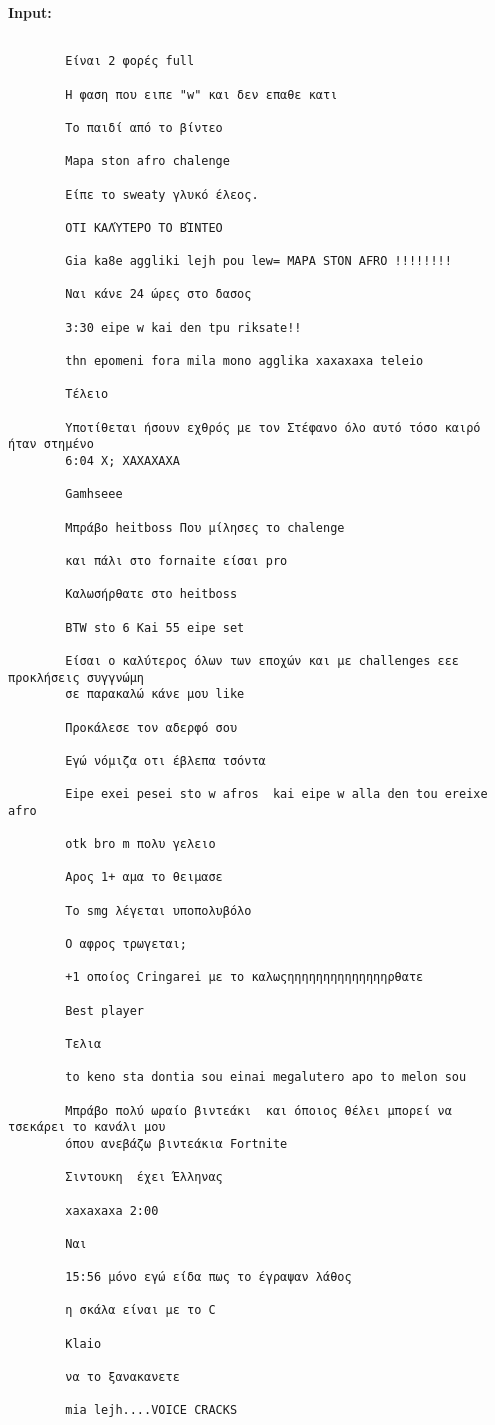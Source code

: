 \documentclass[11pt, a4paper]{article}
\begin{document}
	\textbf{Input:}
	\begin{verbatim}
		
		Είναι 2 φορές full
		
		Η φαση που ειπε "w" και δεν επαθε κατι
		
		Το παιδί από το βίντεο
		
		Mapa ston afro chalenge
		
		Είπε το sweaty γλυκό έλεος.
		
		ΟΤΙ ΚΑΛΎΤΕΡΟ ΤΟ ΒΊΝΤΕΟ
		
		Gia ka8e aggliki lejh pou lew= MAPA STON AFRO !!!!!!!!
		
		Ναι κάνε 24 ώρες στο δασος
		
		3:30 eipe w kai den tpu riksate!!
		
		thn epomeni fora mila mono agglika xaxaxaxa teleio
		
		Τέλειο
		
		Υποτίθεται ήσουν εχθρός με τον Στέφανο όλο αυτό τόσο καιρό ήταν στημένο 
		6:04 Χ; ΧΑΧΑΧΑΧΑ
		
		Gamhseee
		
		Μπράβο heitboss Που μίλησες το chalenge
		
		και πάλι στο fornaite είσαι pro
		
		Καλωσήρθατε στο heitboss
		
		BTW sto 6 Kai 55 eipe set
		
		Είσαι ο καλύτερος όλων των εποχών και με challenges εεε προκλήσεις συγγνώμη 
		σε παρακαλώ κάνε μου like
		
		Προκάλεσε τον αδερφό σου
		
		Εγώ νόμιζα οτι έβλεπα τσόντα
		
		Eipe exei pesei sto w afros  kai eipe w alla den tou ereixe afro
		
		otk bro m πολυ γελειο
		
		Αρος 1+ αμα το θειμασε
		
		Το smg λέγεται υποπολυβόλο
		
		Ο αφρος τρωγεται;
		
		+1 οποίος Cringarei με το καλωςηηηηηηηηηηηηηηρθατε
		
		Best player
		
		Τελια
		
		to keno sta dontia sou einai megalutero apo to melon sou
		
		Μπράβο πολύ ωραίο βιντεάκι  και όποιος θέλει μπορεί να τσεκάρει το κανάλι μου 
		όπου ανεβάζω βιντεάκια Fortnite
		
		Σιντουκη  έχει Έλληνας
		
		xaxaxaxa 2:00
		
		Ναι
		
		15:56 μόνο εγώ είδα πως το έγραψαν λάθος
		
		η σκάλα είναι με το C
		
		Klaio
		
		να το ξανακανετε
		
		mia lejh....VOICE CRACKS
	\end{verbatim}
	
\end{document}
